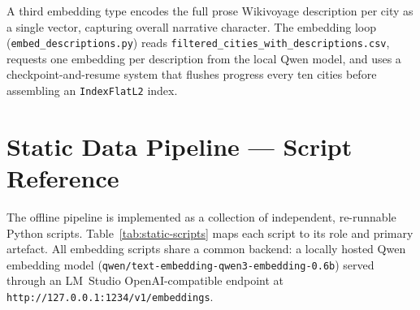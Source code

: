 \documentclass[12pt,a4paper]{report}
\begin{document}
\begin{appendices}
A third embedding type encodes the full prose Wikivoyage description per city as a single vector,
capturing overall narrative character. The embedding loop (\texttt{embed\_descriptions.py}) reads
\texttt{filtered\_cities\_with\_descriptions.csv}, requests one embedding per description from the
local Qwen model, and uses a checkpoint-and-resume system that flushes progress every ten cities
before assembling an \texttt{IndexFlatL2} index.

\section{Static Data Pipeline --- Script Reference}
\label{app:static-script-reference}

The offline pipeline is implemented as a collection of independent, re-runnable Python scripts.
Table~\ref{tab:static-scripts} maps each script to its role and primary artefact. All embedding
scripts share a common backend: a locally hosted Qwen embedding model
(\texttt{qwen/text-embedding-qwen3-embedding-0.6b}) served through an LM~Studio
OpenAI-compatible endpoint at \texttt{http://127.0.0.1:1234/v1/embeddings}.


\end{appendices}
\end{document}
